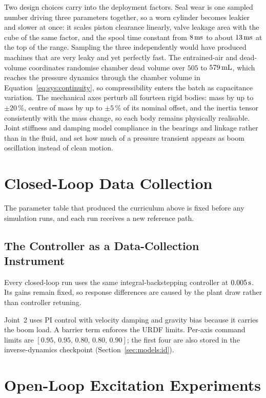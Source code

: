 Two design choices carry into the deployment factors. Seal wear is one sampled
number driving three parameters together, so a worn cylinder becomes leakier and
slower at once: it scales piston clearance linearly, valve leakage area with the
cube of the same factor, and the spool time constant from $\unit[8]{ms}$ to
about $\unit[13]{ms}$ at the top of the range. Sampling the three independently
would have produced machines that are very leaky and yet perfectly fast. The
entrained-air and dead-volume coordinates randomise chamber dead volume over
$505$ to $\unit[579]{mL}$, which reaches the pressure dynamics through the
chamber volume in Equation~\eqref{eq:sys:continuity}, so compressibility enters
the batch as capacitance variation. The mechanical axes perturb all fourteen
rigid bodies: mass by up to $\pm 20\,\%$, centre of mass by up to $\pm 5\,\%$
of its nominal offset, and the inertia tensor consistently with the mass change,
so each body remains physically realisable. Joint stiffness and damping model
compliance in the bearings and linkage rather than in the fluid, and set how
much of a pressure transient appears as boom oscillation instead of clean
motion.

\section{Closed-Loop Data Collection}
\label{sec:data:closed-loop}

The parameter table that produced the curriculum above is fixed before any
simulation runs, and each run receives a new reference path.

\subsection{The Controller as a Data-Collection Instrument}

Every closed-loop run uses the same integral-backstepping controller at
$\unit[0.005]{s}$. Its gains remain fixed, so response differences are caused
by the plant draw rather than controller retuning.

Joint~2 uses PI control with velocity damping and gravity bias because it
carries the boom load. A barrier term enforces the URDF limits. Per-axis
command limits are $[0.95,\,0.95,\,0.80,\,0.80,\,0.90]$; the first four are
also stored in the inverse-dynamics checkpoint
(Section~\ref{sec:models:id}).

\section{Open-Loop Excitation Experiments}
\label{sec:data:open-loop}

